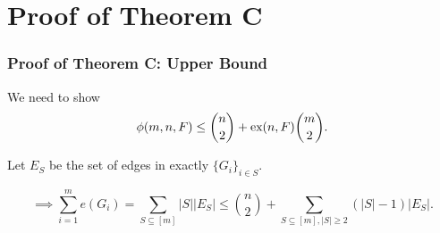 \documentclass{beamer}
\newcommand*{\ex}{\textnormal{ex}}
\begin{document}










\section{Proof of Theorem C}

\begin{frame}
  \frametitle{Proof of Theorem C: Upper Bound}

  We need to show
  \[  
    \phi(m, n ,F) \leq \binom{n}{2} + \ex(n, F)\binom{m}{2}.  
  \]

  \pause
  
  Let $E_S$ be the set of edges in exactly $\{G_i\}_{i \in S}$.

  \pause

  \[
    \implies \sum_{i = 1}^m e(G_i) = \sum_{S \subseteq [m]} |S||E_S| \leq \binom{n}{2} + \sum_{S \subseteq [m], |S| \geq 2} (|S| - 1)|E_S|.
  \]
\end{frame}
\end{document}
